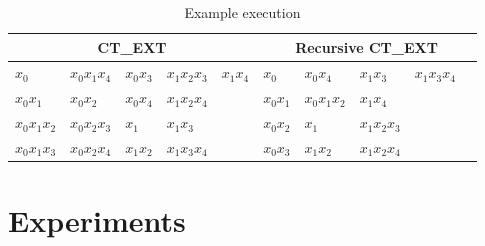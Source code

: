 \documentclass[citeauthoryear]{llncs}
\begin{document}
	\begin{table}[!htb]\label{tab:run}
		\setlength{\tabcolsep}{.4em}
		\caption{Example execution}
      	\centering
    		\begin{tabular}{|lllll|lllll|}
    		\hline
    		\multicolumn{5}{|c|}{CT\_EXT} & \multicolumn{5}{c|}{Recursive CT\_EXT}\\
    		\hline
    		$x_0$		& $x_0x_1x_4$ & $x_0x_3$	& $x_1x_2x_3$ & $x_1x_4$	& $x_0$	   & $x_0x_4$&$x_1x_3$& $x_1x_3x_4$&\\
    		$x_0x_1$		& $x_0x_2$	  & $x_0x_4$	& $x_1x_2x_4$ &			& $x_0x_1$ & $x_0x_1x_2$ & $x_1x_4$	&&\\
    		$x_0x_1x_2$	& $x_0x_2x_3	$ & $x_1$	& $x_1x_3$	  &			& $x_0x_2$ & $x_1$		 & $x_1x_2x_3$&&\\
    		$x_0x_1x_3$	& $x_0x_2x_4$ & $x_1x_2$	& $x_1x_3x_4$ &			& $x_0x_3$ & $x_1x_2$	 & $x_1x_2x_4$&&\\
    		\hline
		\end{tabular}
	\end{table}
%
\section{Experiments}
%
%
\end{document}
